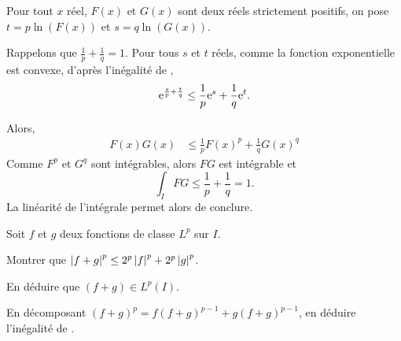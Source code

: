 \begin{solution}
\begin{reponses}
\item Pour tout $x$ réel, $F(x)$ et $G(x)$ sont deux réels strictement positifs, on pose $t = p \ln(F(x))$ et $s = q \ln(G(x))$.

\item Rappelons que $\frac{1}{p} + \frac{1}{q} = 1$. Pour tous $s$ et $t$ réels, comme la fonction exponentielle est convexe, d'après l'inégalité de ,
\[
\mathrm{e}^{\frac{s}{p} + \frac{t}{q}} \leq \frac{1}{p} \mathrm{e}^s + \frac{1}{q} \mathrm{e}^t.
\]

\item Alors,
\begin{align*}
F(x) G(x) &\leq \frac{1}{p} F(x)^p + \frac{1}{q} G(x)^q
\end{align*}
Comme $F^p$ et $G^q$ sont intégrables, alors $F G$ est intégrable et
\[
\int_I F G \leq \frac{1}{p} + \frac{1}{q} = 1.
\]
La linéarité de l'intégrale permet alors de conclure.
\end{reponses}
\end{solution}

\begin{exercice}
Soit $f$ et $g$ deux fonctions de classe $L^p$ sur $I$.
\begin{questions}
\item Montrer que $\left| f + g \right|^p \leq 2^p \left| f \right|^p + 2^p \left| g \right|^p$.

\item En déduire que $(f + g) \in L^p(I)$.

\item En décomposant $(f + g)^p = f (f + g)^{p-1} + g (f + g)^{p-1}$, en déduire l'inégalité de .
\end{questions}
\end{exercice}

